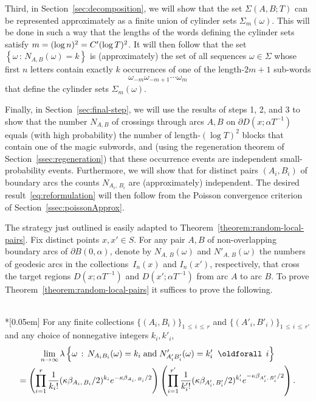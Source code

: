 \documentclass[AHL, Unicode, longabstracts, published]{cedram}
\newcommand{\xset}[1]{\left\{ #1 \right\}}
\renewcommand*{\forall}{\mathrel{\oldforall}}
\begin{document}
Third, in Section~\ref{sec:decomposition}, we will show that the set $\Sigma (A,B;T)$ can be represented approximately as a finite union of cylinder sets $\Sigma_{m}(\omega)$. This will be done in such a way that the lengths of the words defining the cylinder sets satisfy $m= (\log n)^{2}\linebreak=C' (\log T)^{2}$. It will then follow that the set $\xset {\omega \,:\, N_{A,B}(\omega)=k}$ is (approximately) the set of all sequences $\omega \in \Sigma$ whose first $n$ letters contain exactly $k$ occurrences of one of the length-$2m+1$ sub-words
\begin{equation}\label{eq:magic-subword}
\omega_{-m}\omega_{-m+1} \cdots \omega_{m}
\end{equation}
that define the cylinder sets $\Sigma_{m}(\omega)$.

Finally, in Section~\ref{sec:final-step}, we will use the results of steps 1, 2, and 3 to show that the number $N_{A,B} $ of crossings through arcs $A,B$ on $\partial D(x;\alpha T^{-1})$ equals (with high probability) the number of length-$(\log T)^{2}$ blocks that contain one of the magic subwords, and (using the regeneration theorem of Section~\ref{ssec:regeneration}) that these occurrence events are independent small-probability events. Furthermore, we will show that for distinct pairs $(A_{i},B_{i})$ of boundary arcs the counts $N_{A_{i},\,B_{i}}$ are (approximately) independent. The desired result~\eqref{eq:reformulation} will then follow from the Poisson convergence criterion of Section~\ref{ssec:poissonApprox}.

The strategy just outlined is easily adapted to Theorem~\ref{theorem:random-local-pairs}. Fix distinct points $x,x'\in S$. For any pair $A,B$ of non-overlapping boundary arcs of $\partial B (0,\alpha)$, denote by $N_{A,\,B} (\omega)$ and $N'_{A,\,B} (\omega)$ the numbers of geodesic arcs in the collections~$I_{n} (x)$ and $I_{n} (x')$, respectively, that cross the target regions $D(x;\alpha T^{-1})$ and $D(x';\alpha T^{-1})$ from arc $A$ to arc $B$. To prove Theorem~\ref{theorem:random-local-pairs} it suffices to prove the following.

\begin{prop}\label{proposition:reformulation-pairs}\ \\*[0.05em]
For any finite collections $\{(A_{i},B_{i}) \}_{1\,\leq\,i\,\leq\,r}$ and $\{(A'_{i},B'_{i}) \}_{1\,\leq\,i\,\leq\,r'}$ and any choice of nonnegative integers $k_{i},k'_{i}$,
\begin{multline}\label{eq:reformulation-pairs}
\lim_{n \rightarrow \infty} \lambda \left\{\omega \,:\, N_{A_{i}B_{i}} (\omega)=k_{i} \;\text{and}\; N'_{A'_{i}B'_{i}} (\omega)=k'_{i} \; \forall
\,i\right\}\\
=\left(\prod_{i=1}^{r} \frac{1}{k_{i}!} (\kappa \beta_{A_{i},\,B_{i}}/2)^{k_{i}} e^{- \kappa \beta_{A_{i},\,B_{i}}/2} \right) \left(\prod_{i=1}^{r'} \frac{1}{k'_{i}!}(\kappa
\beta_{A'_{i},\,B'_{i}}/2)^{k'_{i}} e^{- \kappa \beta_{A'_{i},\,B'_{i}}/2} \right).
\end{multline}
\end{prop}
\end{document}

